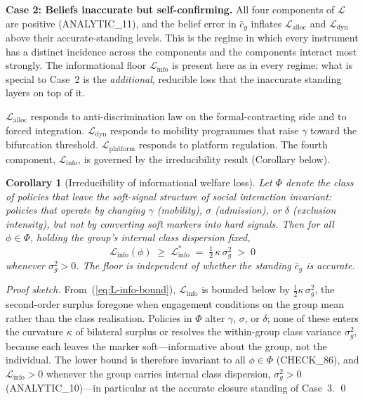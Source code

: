 \documentclass[12pt,a4paper]{article}
\newtheorem{corollary}[proposition]{Corollary}
\theoremstyle{definition}
\numberwithin{proposition}{section}
\begin{document}
\textbf{Case 2: Beliefs inaccurate but self-confirming.}
All four components of $\mathcal{L}$ are positive (ANALYTIC\_11), and
the belief error in $\bar{c}_g$ inflates $\mathcal{L}_{\text{alloc}}$
and $\mathcal{L}_{\text{dyn}}$ above their accurate-standing levels.
This is the regime in which every instrument has a distinct incidence
across the components and the components interact most strongly. The
informational floor $\mathcal{L}_{\text{info}}$ is present here as in
every regime; what is special to Case~2 is the \emph{additional},
reducible loss that the inaccurate standing layers on top of it.

$\mathcal{L}_{\text{alloc}}$ responds to anti-discrimination law on
the formal-contracting side and to forced integration.
$\mathcal{L}_{\text{dyn}}$ responds to mobility programmes that
raise $\gamma$ toward the bifurcation threshold.
$\mathcal{L}_{\text{platform}}$ responds to platform regulation.
The fourth component, $\mathcal{L}_{\text{info}}$, is governed by
the irreducibility result (Corollary below).

\begin{corollary}[Irreducibility of informational welfare loss]
\label{cor:irreducibility-addendum}
Let $\Phi$ denote the class of policies that leave the soft-signal
structure of social interaction invariant: policies that operate by
changing $\gamma$ (mobility), $\sigma$ (admission), or $\delta$
(exclusion intensity), but not by converting soft markers into hard
signals. Then for all $\phi \in \Phi$, holding the group's internal
class dispersion fixed,
\[
  \mathcal{L}_{\mathrm{info}}(\phi)
  \;\geq\; \mathcal{L}_{\mathrm{info}}^*
  \;=\; \tfrac{1}{2}\,\kappa\,\sigma^2_g \;>\; 0
\]
whenever $\sigma^2_g > 0$. The floor is independent of whether the
standing $\bar{c}_g$ is accurate.
\end{corollary}

\begin{proof}[Proof sketch]
From~(\ref{eq:L-info-bound}), $\mathcal{L}_{\text{info}}$ is bounded
below by $\tfrac{1}{2}\kappa\,\sigma^2_g$, the second-order surplus
foregone when engagement conditions on the group mean rather than the
class realisation. Policies in $\Phi$ alter $\gamma$, $\sigma$, or
$\delta$; none of these enters the curvature $\kappa$ of bilateral
surplus or resolves the within-group class variance $\sigma^2_g$,
because each leaves the marker soft---informative about the group, not
the individual. The lower bound is therefore invariant to all
$\phi \in \Phi$ (CHECK\_86), and $\mathcal{L}_{\text{info}} > 0$
whenever the group carries internal class dispersion, $\sigma^2_g > 0$
(ANALYTIC\_10)---in particular at the accurate closure standing of
Case~3.
\qed
\end{proof}
\end{document}
